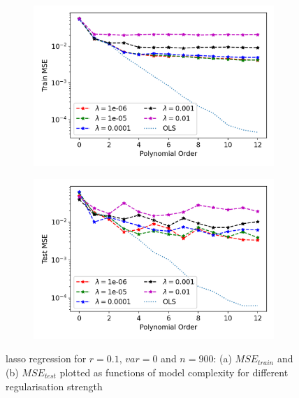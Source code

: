 \begin{figure}[htb]
\centering
\begin{subfigure}{.5\textwidth}
  \centering
  \includegraphics[width=.9\linewidth]{Images/lasso7b.png}
  \caption{}
  \label{fig:lasso7}
\end{subfigure}%
\begin{subfigure}{.5\textwidth}
  \centering
  \includegraphics[width=.9\linewidth]{Images/lasso7.png}
  \caption{}
  \label{fig:lasso7b}
\end{subfigure}
\caption{lasso regression for $r=0.1$, $var=0$ and $n=900$: (a) $MSE_{train}$ and (b) $MSE_{test}$ plotted as functions of model complexity for different regularisation strength}
\label{fig:Lasso1}
\end{figure}


